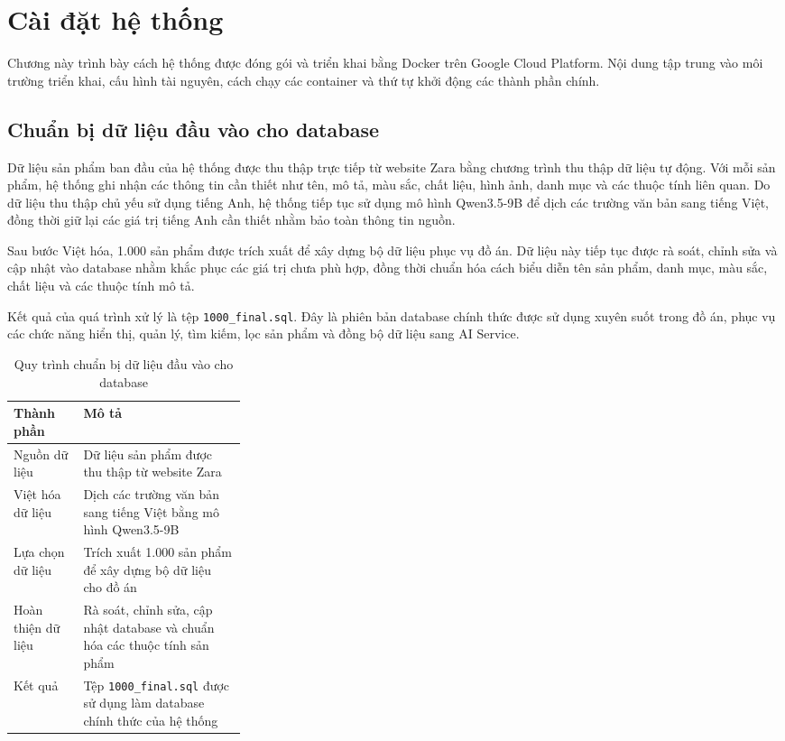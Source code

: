 
\section{Cài đặt hệ thống}

Chương này trình bày cách hệ thống được đóng gói và triển khai bằng Docker trên Google Cloud Platform. Nội dung tập trung vào môi trường triển khai, cấu hình tài nguyên, cách chạy các container và thứ tự khởi động các thành phần chính.
\subsection{Chuẩn bị dữ liệu đầu vào cho database}

Dữ liệu sản phẩm ban đầu của hệ thống được thu thập trực tiếp từ website Zara bằng chương trình thu thập dữ liệu tự động. Với mỗi sản phẩm, hệ thống ghi nhận các thông tin cần thiết như tên, mô tả, màu sắc, chất liệu, hình ảnh, danh mục và các thuộc tính liên quan. Do dữ liệu thu thập chủ yếu sử dụng tiếng Anh, hệ thống tiếp tục sử dụng mô hình Qwen3.5-9B để dịch các trường văn bản sang tiếng Việt, đồng thời giữ lại các giá trị tiếng Anh cần thiết nhằm bảo toàn thông tin nguồn.

Sau bước Việt hóa, 1.000 sản phẩm được trích xuất để xây dựng bộ dữ liệu phục vụ đồ án. Dữ liệu này tiếp tục được rà soát, chỉnh sửa và cập nhật vào database nhằm khắc phục các giá trị chưa phù hợp, đồng thời chuẩn hóa cách biểu diễn tên sản phẩm, danh mục, màu sắc, chất liệu và các thuộc tính mô tả.

Kết quả của quá trình xử lý là tệp \texttt{1000\_final.sql}. Đây là phiên bản database chính thức được sử dụng xuyên suốt trong đồ án, phục vụ các chức năng hiển thị, quản lý, tìm kiếm, lọc sản phẩm và đồng bộ dữ liệu sang AI Service.

\begin{table}[H]
\centering
\caption{Quy trình chuẩn bị dữ liệu đầu vào cho database}
\label{tab:database-input-dataset}
\begin{tabularx}{\linewidth}{|p{0.30\linewidth}|X|}
\hline
\textbf{Thành phần} & \textbf{Mô tả} \\ \hline
Nguồn dữ liệu & Dữ liệu sản phẩm được thu thập từ website Zara \\ \hline
Việt hóa dữ liệu & Dịch các trường văn bản sang tiếng Việt bằng mô hình Qwen3.5-9B \\ \hline
Lựa chọn dữ liệu & Trích xuất 1.000 sản phẩm để xây dựng bộ dữ liệu cho đồ án \\ \hline
Hoàn thiện dữ liệu & Rà soát, chỉnh sửa, cập nhật database và chuẩn hóa các thuộc tính sản phẩm \\ \hline
Kết quả & Tệp \texttt{1000\_final.sql} được sử dụng làm database chính thức của hệ thống \\ \hline
\end{tabularx}
\end{table}

